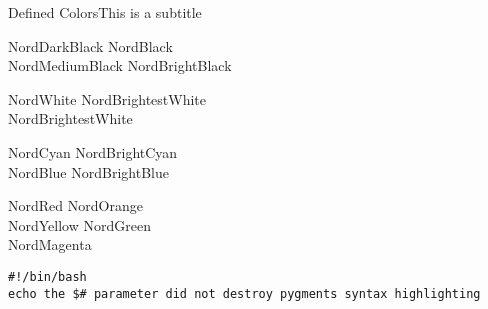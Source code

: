 \documentclass{beamer}
\begin{document}
\begin{frame}{Defined Colors}{This is a subtitle}
	\begin{description}
		\item[Polar Night]
			\textcolor{NordDarkBlack}{NordDarkBlack} \quad \textcolor{NordBlack}{NordBlack}\\
			\textcolor{NordMediumBlack}{NordMediumBlack} \quad \textcolor{NordBrightBlack}{NordBrightBlack}
		\item[Snow Storm]
			\textcolor{NordWhite}{NordWhite} \quad \textcolor{NordBrighterWhite}{NordBrightestWhite}\\
			\textcolor{NordBrightestWhite}{NordBrightestWhite}
		\item[Frost]
			\textcolor{NordCyan}{NordCyan} \quad \textcolor{NordBrightCyan}{NordBrightCyan}\\
			\textcolor{NordBlue}{NordBlue} \quad \textcolor{NordBrightBlue}{NordBrightBlue}
		\item[Aurora]
			\textcolor{NordRed}{NordRed} \quad \textcolor{NordOrange}{NordOrange} \\
			\textcolor{NordYellow}{NordYellow} \quad \textcolor{NordGreen}{NordGreen} \\
			\textcolor{NordMagenta}{NordMagenta}
	\end{description}
\end{frame}

\begin{frame}
\end{frame}

\begin{frame}[fragile]
\tiny\ttfamily
\begin{lstlisting}
#!/bin/bash
echo the $# parameter did not destroy pygments syntax highlighting
\end{lstlisting}
\end{frame}

\lstset{basicstyle=\footnotesize\ttfamily,breaklines=true}
\begin{frame}
	
\end{frame}
\end{document}
